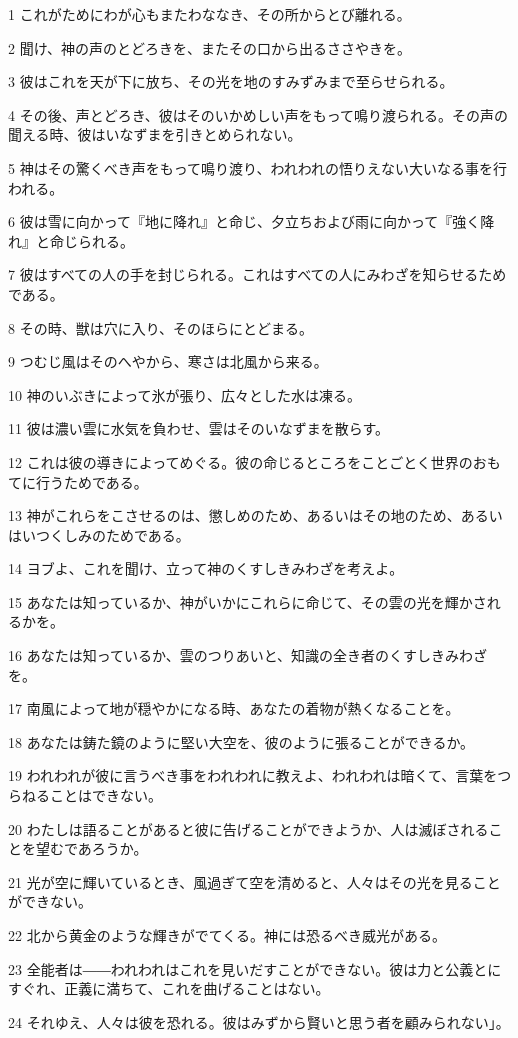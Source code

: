 \par 1 これがためにわが心もまたわななき、その所からとび離れる。
\par 2 聞け、神の声のとどろきを、またその口から出るささやきを。
\par 3 彼はこれを天が下に放ち、その光を地のすみずみまで至らせられる。
\par 4 その後、声とどろき、彼はそのいかめしい声をもって鳴り渡られる。その声の聞える時、彼はいなずまを引きとめられない。
\par 5 神はその驚くべき声をもって鳴り渡り、われわれの悟りえない大いなる事を行われる。
\par 6 彼は雪に向かって『地に降れ』と命じ、夕立ちおよび雨に向かって『強く降れ』と命じられる。
\par 7 彼はすべての人の手を封じられる。これはすべての人にみわざを知らせるためである。
\par 8 その時、獣は穴に入り、そのほらにとどまる。
\par 9 つむじ風はそのへやから、寒さは北風から来る。
\par 10 神のいぶきによって氷が張り、広々とした水は凍る。
\par 11 彼は濃い雲に水気を負わせ、雲はそのいなずまを散らす。
\par 12 これは彼の導きによってめぐる。彼の命じるところをことごとく世界のおもてに行うためである。
\par 13 神がこれらをこさせるのは、懲しめのため、あるいはその地のため、あるいはいつくしみのためである。
\par 14 ヨブよ、これを聞け、立って神のくすしきみわざを考えよ。
\par 15 あなたは知っているか、神がいかにこれらに命じて、その雲の光を輝かされるかを。
\par 16 あなたは知っているか、雲のつりあいと、知識の全き者のくすしきみわざを。
\par 17 南風によって地が穏やかになる時、あなたの着物が熱くなることを。
\par 18 あなたは鋳た鏡のように堅い大空を、彼のように張ることができるか。
\par 19 われわれが彼に言うべき事をわれわれに教えよ、われわれは暗くて、言葉をつらねることはできない。
\par 20 わたしは語ることがあると彼に告げることができようか、人は滅ぼされることを望むであろうか。
\par 21 光が空に輝いているとき、風過ぎて空を清めると、人々はその光を見ることができない。
\par 22 北から黄金のような輝きがでてくる。神には恐るべき威光がある。
\par 23 全能者は――われわれはこれを見いだすことができない。彼は力と公義とにすぐれ、正義に満ちて、これを曲げることはない。
\par 24 それゆえ、人々は彼を恐れる。彼はみずから賢いと思う者を顧みられない」。

